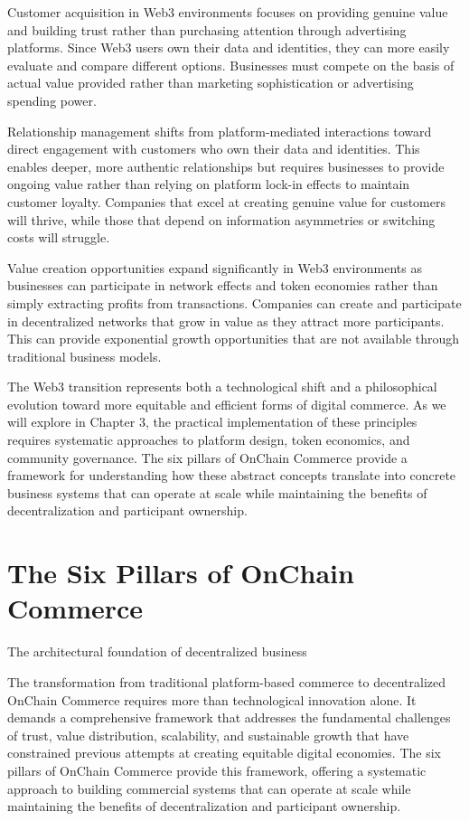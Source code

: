 \documentclass[
  Letterpaper,
]{scrbook}
\begin{document}
Customer acquisition in Web3 environments focuses on providing genuine
value and building trust rather than purchasing attention through
advertising platforms. Since Web3 users own their data and identities,
they can more easily evaluate and compare different options. Businesses
must compete on the basis of actual value provided rather than marketing
sophistication or advertising spending power.

Relationship management shifts from platform-mediated interactions
toward direct engagement with customers who own their data and
identities. This enables deeper, more authentic relationships but
requires businesses to provide ongoing value rather than relying on
platform lock-in effects to maintain customer loyalty. Companies that
excel at creating genuine value for customers will thrive, while those
that depend on information asymmetries or switching costs will struggle.

Value creation opportunities expand significantly in Web3 environments
as businesses can participate in network effects and token economies
rather than simply extracting profits from transactions. Companies can
create and participate in decentralized networks that grow in value as
they attract more participants. This can provide exponential growth
opportunities that are not available through traditional business
models.

The Web3 transition represents both a technological shift and a
philosophical evolution toward more equitable and efficient forms of
digital commerce. As we will explore in Chapter 3, the practical
implementation of these principles requires systematic approaches to
platform design, token economics, and community governance. The six
pillars of OnChain Commerce provide a framework for understanding how
these abstract concepts translate into concrete business systems that
can operate at scale while maintaining the benefits of decentralization
and participant ownership.

\chapter{The Six Pillars of OnChain Commerce}\label{sec-six-pillars}

The architectural foundation of decentralized business

The transformation from traditional platform-based commerce to
decentralized OnChain Commerce requires more than technological
innovation alone. It demands a comprehensive framework that addresses
the fundamental challenges of trust, value distribution, scalability,
and sustainable growth that have constrained previous attempts at
creating equitable digital economies. The six pillars of OnChain
Commerce provide this framework, offering a systematic approach to
building commercial systems that can operate at scale while maintaining
the benefits of decentralization and participant ownership.
\end{document}
